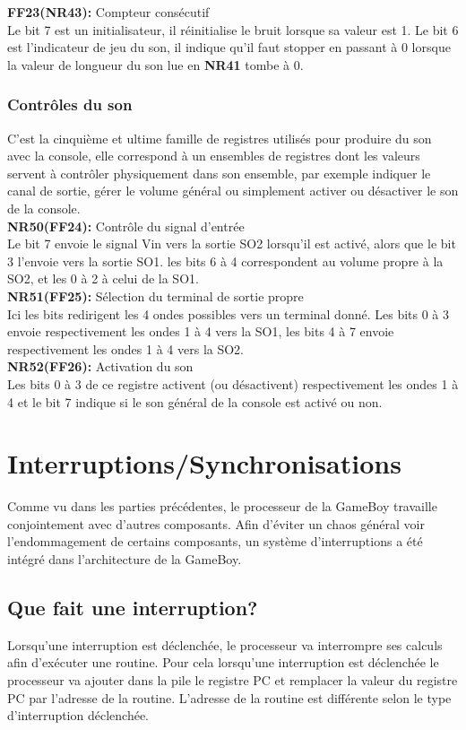 \documentclass{report}
\begin{document}
		\textbf{FF23(NR43):} Compteur consécutif\\
		Le bit 7 est un initialisateur, il réinitialise le bruit
		lorsque sa valeur est 1.
		Le bit 6 est l'indicateur de jeu du son, il indique
		qu'il faut stopper en passant à 0 lorsque la valeur de
		longueur du son lue en \textbf{NR41} tombe à 0. 
	\subsubsection{Contrôles du son}
		C'est la cinquième et ultime famille de registres
		utilisés pour produire du son avec la console, elle
		correspond à un ensembles de registres dont les
		valeurs servent à contrôler physiquement dans son
		ensemble, par exemple indiquer le canal de sortie,
		gérer le volume général ou simplement activer ou
		désactiver le son de la console. \\

		\textbf{NR50(FF24):} Contrôle du signal d'entrée \\ 
		Le bit 7 envoie le signal Vin vers la sortie SO2
		lorsqu'il est activé, alors que le bit 3 l'envoie vers
		la sortie SO1. les bits 6 à 4 correspondent au volume
		propre à la SO2, et les 0 à 2 à celui de la SO1. \\

		\textbf{NR51(FF25):} Sélection du terminal de sortie propre \\
		Ici les bits redirigent les 4 ondes possibles vers un
		terminal donné.
		Les bits 0 à 3 envoie respectivement les ondes 1 à 4
		vers la SO1, les bits 4 à 7 envoie respectivement les
		ondes 1 à 4 vers la SO2.\\

		\textbf{NR52(FF26):} Activation du son \\
		Les bits 0 à 3 de ce registre activent (ou
		désactivent) respectivement les ondes 1 à 4 et le bit
		7 indique si le son général de la console est activé
		ou non.
\section{Interruptions/Synchronisations}
Comme vu dans les parties précédentes, le processeur de la GameBoy travaille conjointement avec d'autres composants. Afin d'éviter un chaos général voir l'endommagement de certains composants, un système d'interruptions a été intégré dans l'architecture de la GameBoy.
\subsection{Que fait une interruption?}
Lorsqu'une interruption est déclenchée, le processeur va interrompre ses calculs afin d'exécuter une routine. Pour cela lorsqu'une interruption est déclenchée le processeur va ajouter dans la pile le registre PC et remplacer la valeur du registre PC par l'adresse de la routine. L'adresse de la routine est différente selon le type d'interruption déclenchée.
\end{document}
